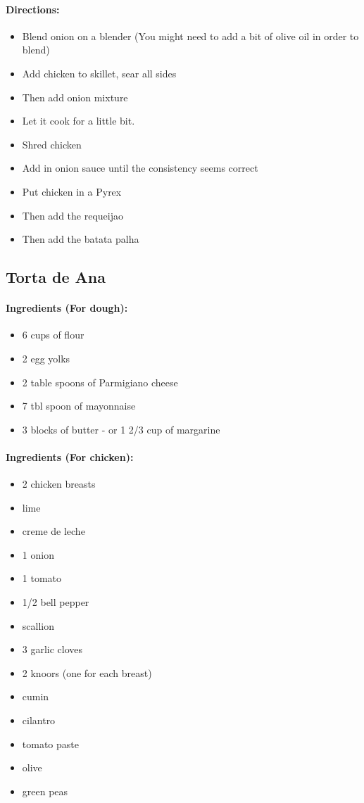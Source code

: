 \documentclass{article}
\begin{document}
\paragraph{Directions:}
\begin{itemize}
    \item Blend onion on a blender (You might need to add a bit of olive oil in order to blend)
    \item Add chicken to skillet, sear all sides
    \item Then add onion mixture
    \item Let it cook for a little bit.
    \item Shred chicken
    \item Add in onion sauce until the consistency seems correct
    \item Put chicken in a Pyrex
    \item Then add the requeijao
    \item Then add the batata palha
\end{itemize}

\subsection{Torta de Ana} 

\paragraph{Ingredients (For dough):}
\begin{itemize}
    \item 6 cups of flour
    \item 2 egg yolks
    \item 2 table spoons of Parmigiano cheese
    \item 7 tbl spoon of mayonnaise
    \item 3 blocks of butter - or 1 2/3 cup of margarine
\end{itemize}  

\paragraph{Ingredients (For chicken):}
\begin{itemize}
    \item 2 chicken breasts
    \item lime
    \item creme de leche
    \item 1 onion
    \item 1 tomato
    \item 1/2 bell pepper
    \item scallion
    \item 3 garlic cloves
    \item 2 knoors (one for each breast)
    \item cumin
    \item cilantro
    \item tomato paste
    \item olive
    \item green peas
\end{itemize}  
\end{document}
